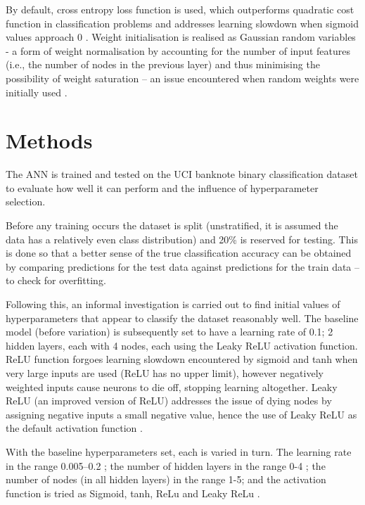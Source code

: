 \documentclass[12pt]{article}
\begin{document}
By default, cross entropy loss function is used, which outperforms
quadratic cost function in classification problems and addresses
learning slowdown when sigmoid values approach 0 \cite{Nielsen}
\cite{Xavier}. Weight initialisation is realised as Gaussian random
variables - a form of weight normalisation by accounting for the number
of input features (i.e., the number of nodes in the previous layer) and
thus minimising the possibility of weight saturation -- an issue
encountered when random weights were initially used \cite{Nielsen}.

\vspace{-1.5em}
\section{Methods}
\vspace{-1.5em}

The ANN is trained and tested on the UCI banknote binary
classification dataset to evaluate how well it can perform and the
influence of hyperparameter selection.

Before any training occurs the dataset is split (unstratified, it is
assumed the data has a relatively even class distribution) and 20\%
is reserved for testing. This is done so that a better sense of the
true classification accuracy can be obtained by comparing predictions
for the test data against predictions for the train data -- to check for
overfitting.

Following this, an informal investigation is carried out to find initial
values of hyperparameters that appear to classify the dataset reasonably
well. The baseline model (before variation) is subsequently set to
have a learning rate of 0.1; 2 hidden layers, each with 4 nodes,
each using the Leaky ReLU activation function. ReLU function forgoes learning slowdown encountered by sigmoid and tanh when very large inputs are used (ReLU has no upper limit), however negatively weighted inputs cause neurons to die off, stopping learning altogether. Leaky ReLU (an improved version of ReLU) addresses the issue of dying nodes by assigning negative inputs a small negative value, hence the use of Leaky ReLU as the default activation function \cite{Niwa}.

With the baseline hyperparameters set, each is varied in turn. The
learning rate in the range 0.005--0.2 \cite{Nielsen}; the number of hidden layers in
the range 0-4 \cite{Xavier}; the number of nodes (in all hidden layers) in the range
1-5; and the activation function is tried as Sigmoid, tanh, ReLu and
Leaky ReLu \cite{Niwa}.
\end{document}
